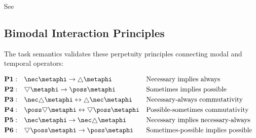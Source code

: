 \documentclass[../LogosReference.tex]{subfiles}
\begin{document}

\noindent
See 



\subsection{Bimodal Interaction Principles}\label{sec:bimodal-interaction}

The task semantics validates these perpetuity principles connecting modal and temporal operators:

\begin{definition}\label{def:perpetuity}
	\begin{align}
		\textbf{P1}: \quad & \nec\metaphi \to \always\metaphi                                        &  & \text{Necessary implies always}            \\
		\textbf{P2}: \quad & \sometimes\metaphi \to \poss\metaphi                                    &  & \text{Sometimes implies possible}          \\
		\textbf{P3}: \quad & \nec\always\metaphi \leftrightarrow \always\nec\metaphi         &  & \text{Necessary-always commutativity}      \\
		\textbf{P4}: \quad & \poss\sometimes\metaphi \leftrightarrow \sometimes\poss\metaphi &  & \text{Possible-sometimes commutativity}    \\
		\textbf{P5}: \quad & \nec\metaphi \to \nec\always\metaphi                                    &  & \text{Necessary implies necessary-always}  \\
		\textbf{P6}: \quad & \sometimes\poss\metaphi \to \poss\metaphi                               &  & \text{Sometimes-possible implies possible}
	\end{align}
\end{definition}
\end{document}
